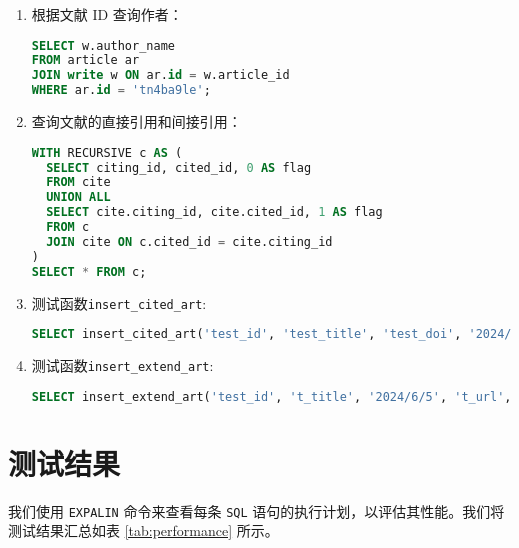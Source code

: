 \documentclass[UTF8,openany]{ctexbook}
\begin{document}
\begin{enumerate}[label=\textbf{\arabic*}]
  \item 根据文献 ID 查询作者：
  \begin{lstlisting}[language=sql]
SELECT w.author_name
FROM article ar
JOIN write w ON ar.id = w.article_id
WHERE ar.id = 'tn4ba9le';
  \end{lstlisting}

  \item 查询文献的直接引用和间接引用：
  \begin{lstlisting}[language=sql]
WITH RECURSIVE c AS (
  SELECT citing_id, cited_id, 0 AS flag
  FROM cite
  UNION ALL
  SELECT cite.citing_id, cite.cited_id, 1 AS flag
  FROM c
  JOIN cite ON c.cited_id = cite.citing_id
)
SELECT * FROM c;
  \end{lstlisting}

  \item 测试函数\texttt{insert\_cited\_art}:
  \begin{lstlisting}[language=sql]
SELECT insert_cited_art('test_id', 'test_title', 'test_doi', '2024/6/5', 'test_journal', 'test_volume', 'test_in_pages', '0;1');
  \end{lstlisting}

  \item 测试函数\texttt{insert\_extend\_art}:
  \begin{lstlisting}[language=sql]
SELECT insert_extend_art('test_id', 't_title', '2024/6/5', 't_url', 't_type', 't_addr', 't_cha', 't_focus', 't_journal');
  \end{lstlisting}
\end{enumerate}

\section{测试结果}

我们使用 \texttt{EXPALIN} 命令来查看每条 \texttt{SQL} 语句的执行计划，以评估其性能。我们将测试结果汇总如表 \ref{tab:performance} 所示。
\end{document}
